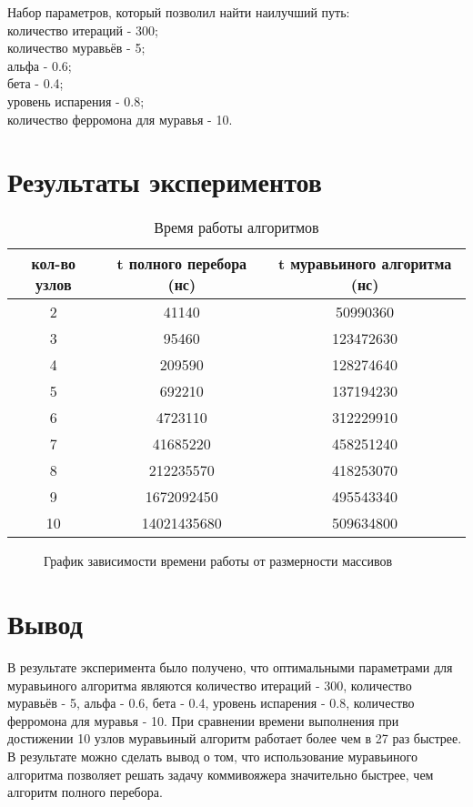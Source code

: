 \noindent Набор параметров, который позволил найти наилучший путь:\\
количество итераций - 300;\\
количество муравьёв - 5;\\ 
альфа - 0.6;\\
бета - 0.4;\\
уровень испарения - 0.8;\\
количество ферромона для муравья - 10.\\

\newpage

\section{Результаты экспериментов}

\begin{table}[ph!]
  \begin{center}
    \captionsetup{justification=raggedright}
     \caption{Время работы алгоритмов}
    \label{tab:workcost_classic}
    \begin{tabular}{c|c|c}
      \textbf{кол-во узлов} & \textbf{t полного перебора (нс)}  & \textbf{t муравьиного алгоритма (нс)}\\
      \hline	
		2 & 41140 & 50990360\\
		3 & 95460 & 123472630\\
		4 & 209590 & 128274640\\
		5 & 692210 & 137194230\\
		6 & 4723110 & 312229910\\
		7 & 41685220 & 458251240\\
		8 & 212235570 & 418253070\\
		9 & 1672092450 & 495543340\\
		10 & 14021435680 & 509634800\\
    \end{tabular}
  \end{center}
\end{table}

\begin{figure}[ph!]
	\caption{График зависимости времени работы от размерности массивов}
\end{figure}

\section{Вывод}
В результате эксперимента было получено, что оптимальными параметрами для муравьиного алгоритма являются количество итераций - 300, количество муравьёв - 5, альфа - 0.6, бета - 0.4, уровень испарения - 0.8, количество ферромона для муравья - 10. При сравнении времени выполнения при достижении 10 узлов муравьиный алгоритм работает более чем в 27 раз быстрее. В результате можно сделать вывод о том, что использование муравьиного алгоритма позволяет решать задачу коммивояжера значительно быстрее, чем алгоритм полного перебора.